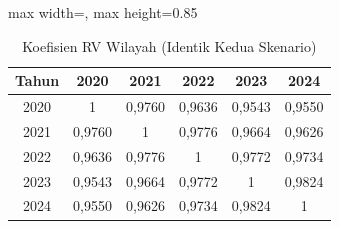 \begin{table}[H]
\centering
\caption{Koefisien RV Wilayah (Identik Kedua Skenario)} \label{tab:apprv_w}
\begin{adjustbox}{max width=\textwidth, max height=0.85\textheight}
\begin{tabular}{|c|c|c|c|c|c|}
\hline
\textbf{Tahun} & \textbf{2020} & \textbf{2021} & \textbf{2022} & \textbf{2023} & \textbf{2024} \\
\hline
2020 & 1 & 0,9760 & 0,9636 & 0,9543 & 0,9550 \\
2021 & 0,9760 & 1 & 0,9776 & 0,9664 & 0,9626 \\
2022 & 0,9636 & 0,9776 & 1 & 0,9772 & 0,9734 \\
2023 & 0,9543 & 0,9664 & 0,9772 & 1 & 0,9824 \\
2024 & 0,9550 & 0,9626 & 0,9734 & 0,9824 & 1 \\
\hline
\end{tabular}
\end{adjustbox}
\end{table}